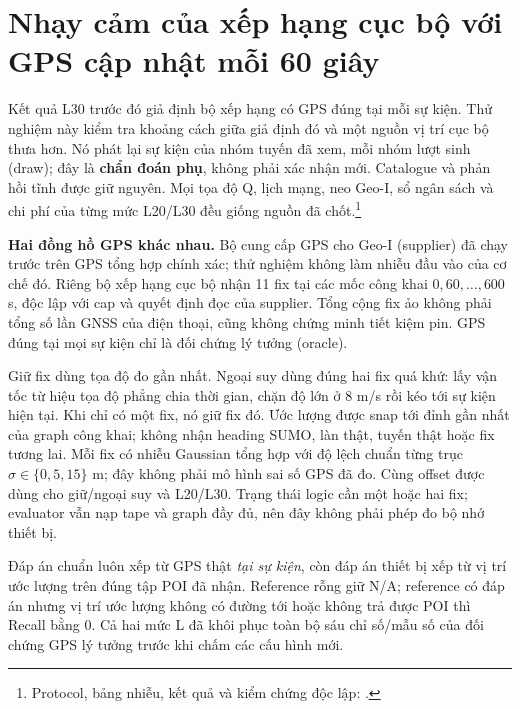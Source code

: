 
\section{Nhạy cảm của xếp hạng cục bộ với GPS cập nhật mỗi 60 giây}
\label{sec:current-local-gps}

Kết quả L30 trước đó giả định bộ xếp hạng có GPS đúng tại mỗi sự kiện. Thử nghiệm này kiểm tra khoảng cách giữa giả định đó và một nguồn vị trí cục bộ thưa hơn. Nó phát lại \SensorEvents{} sự kiện của \SensorFamilyCount{} nhóm tuyến đã xem, mỗi nhóm \SensorDrawCount{} lượt sinh (draw); đây là \textbf{chẩn đoán phụ}, không phải xác nhận mới. Catalogue và phản hồi tĩnh được giữ nguyên. Mọi tọa độ Q, lịch mạng, neo Geo-I, sổ ngân sách và chi phí của từng mức L20/L30 đều giống nguồn đã chốt.\footnote{Protocol, bảng nhiễu, kết quả và kiểm chứng độc lập: .}

\textbf{Hai đồng hồ GPS khác nhau.} Bộ cung cấp GPS cho Geo-I (supplier) đã chạy trước trên GPS tổng hợp chính xác; thử nghiệm không làm nhiễu đầu vào của cơ chế đó. Riêng bộ xếp hạng cục bộ nhận 11 fix tại các mốc công khai $0,60,\ldots,600$ s, độc lập với cap và quyết định đọc của supplier. Tổng cộng \SensorVirtualFixes{} fix ảo không phải tổng số lần GNSS của điện thoại, cũng không chứng minh tiết kiệm pin. GPS đúng tại mọi sự kiện chỉ là đối chứng lý tưởng (oracle).

Giữ fix dùng tọa độ đo gần nhất. Ngoại suy dùng đúng hai fix quá khứ: lấy vận tốc từ hiệu tọa độ phẳng chia thời gian, chặn độ lớn ở 8 m/s rồi kéo tới sự kiện hiện tại. Khi chỉ có một fix, nó giữ fix đó. Ước lượng được snap tới đỉnh gần nhất của graph công khai; không nhận heading SUMO, làn thật, tuyến thật hoặc fix tương lai. Mỗi fix có nhiễu Gaussian tổng hợp với độ lệch chuẩn từng trục $\sigma\in\{0,5,15\}$ m; đây không phải mô hình sai số GPS đã đo. Cùng offset được dùng cho giữ/ngoại suy và L20/L30. Trạng thái logic cần một hoặc hai fix; evaluator vẫn nạp tape và graph đầy đủ, nên đây không phải phép đo bộ nhớ thiết bị.

Đáp án chuẩn luôn xếp từ GPS thật \emph{tại sự kiện}, còn đáp án thiết bị xếp từ vị trí ước lượng trên đúng tập POI đã nhận. Reference rỗng giữ N/A; reference có đáp án nhưng vị trí ước lượng không có đường tới hoặc không trả được POI thì Recall bằng 0. Cả hai mức L đã khôi phục toàn bộ sáu chỉ số/mẫu số của đối chứng GPS lý tưởng trước khi chấm các cấu hình mới.

